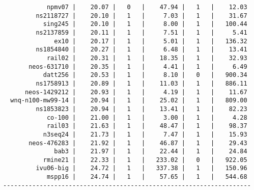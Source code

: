 \begin{verbatim}
            npmv07 |    20.07 |   0   |    47.94 |   1   |    12.03
         ns2118727 |    20.10 |   1   |     7.03 |   1   |    31.67
           sing245 |    20.10 |   1   |     8.00 |   1   |   100.44
         ns2137859 |    20.11 |   1   |     7.51 |   1   |     5.41
              ex10 |    20.17 |   1   |     5.01 |   1   |   136.32
         ns1854840 |    20.27 |   1   |     6.48 |   1   |    13.41
            rail02 |    20.31 |   1   |    18.35 |   1   |    32.93
       neos-631710 |    20.35 |   1   |     4.41 |   1   |     6.49
           datt256 |    20.53 |   1   |     8.10 |   0   |   900.34
         ns1758913 |    20.89 |   1   |    11.03 |   1   |   886.11
      neos-1429212 |    20.93 |   1   |     4.19 |   1   |    11.67
  wnq-n100-mw99-14 |    20.94 |   1   |    25.02 |   1   |   809.00
         ns1853823 |    20.94 |   1   |    13.41 |   1   |    82.23
            co-100 |    21.00 |   1   |     3.00 |   1   |     4.28
            rail03 |    21.63 |   1   |    48.47 |   1   |    98.37
           n3seq24 |    21.73 |   1   |     7.47 |   1   |    15.93
       neos-476283 |    21.92 |   1   |    46.87 |   1   |    29.43
              bab3 |    21.97 |   1   |    22.44 |   1   |    24.84
           rmine21 |    22.33 |   1   |   233.02 |   0   |   922.05
         ivu06-big |    24.72 |   1   |   337.38 |   1   |   150.96
            mspp16 |    24.74 |   1   |    57.65 |   1   |   544.68
--------------------------------------------------------------------
\end{verbatim}
    
